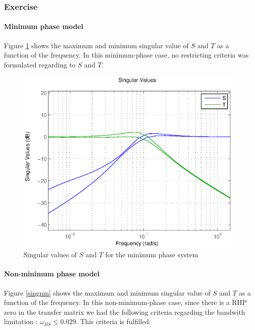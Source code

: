 \subsubsection{Exercise}
\paragraph{Minimum phase model}

Figure \ref{singm} shows the maximum and minimum singular value of $S$ and $T$ as a function of the frequency. 
In this minimum-phase case, no restricting criteria was formulated regarding to $S$ and $T$.

\begin{figure}[h!t]
    \includegraphics[width=\columnwidth]{fig/ST322m.eps}
    \caption{Singular values of $S$ and $T$ for the minimum phase system}
    \label{singm}
\end{figure}

\paragraph{Non-minimum phase model}


Figure \ref{singnm} shows the maximum and minimum singular value of $S$ and $T$ as a function of the frequency. 
In this non-minimum-phase case, since there is a RHP zero in the transfer matrix we had the following criteria regarding the bandwith limitation : $\omega_{BS} \leq 0.029$. This criteria is fulfilled.


